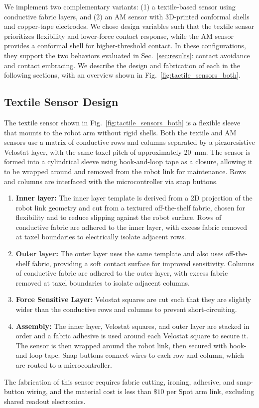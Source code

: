 We implement two complementary variants: (1) a textile-based sensor using conductive fabric layers, and (2) an AM sensor with 3D-printed conformal shells and copper-tape electrodes. We chose design variables such that the textile sensor prioritizes flexibility and lower-force contact response, while the AM sensor provides a conformal shell for higher-threshold contact. In these configurations, they support the two behaviors evaluated in Sec.~\ref{sec:results}: contact avoidance and contact embracing. We describe the design and fabrication of each in the following sections, with an overview shown in Fig.~\ref{fig:tactile_sensors_both}.
\subsection{Textile Sensor Design}
The textile sensor shown in Fig.~\ref{fig:tactile_sensors_both} is a flexible sleeve that mounts to the robot arm without rigid shells. Both the textile and AM sensors use a matrix of conductive rows and columns separated by a piezoresistive Velostat layer, with the same taxel pitch of approximately 20~mm. The sensor is formed into a cylindrical sleeve using hook-and-loop tape as a closure, allowing it to be wrapped around and removed from the robot link for maintenance. Rows and columns are interfaced with the microcontroller via snap buttons.

\begin{enumerate}[leftmargin=*]
\item \textbf{Inner layer:} The inner layer template is derived from a 2D projection of the robot link geometry and cut from a textured off-the-shelf fabric, chosen for flexibility and to reduce slipping against the robot surface. Rows of conductive fabric are adhered to the inner layer, with excess fabric removed at taxel boundaries to electrically isolate adjacent rows.
\item \textbf{Outer layer:} The outer layer uses the same template and also uses off-the-shelf fabric, providing a soft contact surface for improved sensitivity. Columns of conductive fabric are adhered to the outer layer, with excess fabric removed at taxel boundaries to isolate adjacent columns.
\item \textbf{Force Sensitive Layer:} Velostat squares are cut such that they are slightly wider than the conductive rows and columns to prevent short-circuiting.  
\item \textbf{Assembly:} The inner layer, Velostat squares, and outer layer are stacked in order and a fabric adhesive is used around each Velostat square to secure it. The sensor is then wrapped around the robot link, then secured with hook-and-loop tape. Snap buttons connect wires to each row and column, which are routed to a microcontroller.
\end{enumerate}
The fabrication of this sensor requires fabric cutting, ironing, adhesive, and snap-button wiring, and the material cost is less than $\$10$ per Spot arm link, excluding shared readout electronics.




